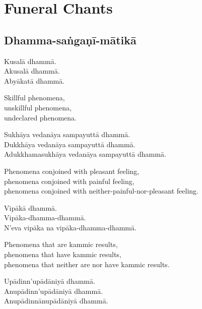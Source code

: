 \chapter{Funeral Chants}

\section{Dhamma-saṅgaṇī-mātikā}




Kusalā dhammā.\\
Akusalā dhammā.\\
Abyākatā dhammā.

\begin{english}
  Skillful phenomena,\\
  unskillful phenomena,\\
  undeclared phenomena.
\end{english}

Sukhāya vedanāya sampayuttā dhammā.\\
Dukkhāya vedanāya sampayuttā dhammā.\\
Adukkhamasukhāya vedanāya sampayuttā dhammā.

\begin{english}
  Phenomena conjoined with pleasant feeling,\\
  phenomena conjoined with painful feeling,\\
  phenomena conjoined with neither-painful-nor-pleasant feeling.
\end{english}

Vipākā dhammā.\\
Vipāka-dhamma-dhammā.\\
N'eva vipāka na vipāka-dhamma-dhammā.

\begin{english}
  Phenomena that are kammic results,\\
  phenomena that have kammic results,\\
  phenomena that neither are nor have kammic results.
\end{english}

Upādinn'upādāniyā dhammā.\\
Anupādinn'upādāniyā dhammā.\\
Anupādinnānupādāniyā dhammā.

